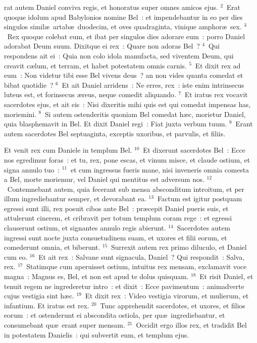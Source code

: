 \bchapter
{}rat autem Daniel conviva regis, et honoratus super omnes amicos ejus.
${}^{2}$~Erat quoque idolum apud Babylonios nomine Bel~: et impendebantur in eo per dies singulos simil\ae\ artab\ae\ duodecim, et oves quadraginta, vinique amphor\ae\ sex.
${}^{3}$~Rex quoque colebat eum, et ibat per singulos dies adorare eum~: porro Daniel adorabat Deum suum. Dixitque ei rex~: Quare non adoras Bel~?
${}^{4}$~Qui respondens ait ei~: Quia non colo idola manufacta, sed viventem Deum, qui creavit c\ae lum, et terram, et habet potestatem omnis carnis.
${}^{5}$~Et dixit rex ad eum~: Non videtur tibi esse Bel vivens deus~? an non vides quanta comedat et bibat quotidie~?
${}^{6}$~Et ait Daniel arridens~: Ne erres, rex~: iste enim intrinsecus luteus est, et forinsecus \ae reus, neque comedit aliquando.
${}^{7}$~Et iratus rex vocavit sacerdotes ejus, et ait eis~: Nisi dixeritis mihi quis est qui comedat impensas has, moriemini.
${}^{8}$~Si autem ostenderitis quoniam Bel comedat h\ae c, morietur Daniel, quia blasphemavit in Bel. Et dixit Daniel regi~: Fiat juxta verbum tuum.
${}^{9}$~Erant autem sacerdotes Bel septuaginta, exceptis uxoribus, et parvulis, et filiis.

 Et venit rex cum Daniele in templum Bel.
${}^{10}$~Et dixerunt sacerdotes Bel~: Ecce nos egredimur foras~: et tu, rex, pone escas, et vinum misce, et claude ostium, et signa annulo tuo~:
${}^{11}$~et cum ingressus fueris mane, nisi inveneris omnia comesta a Bel, morte moriemur, vel Daniel qui mentitus est adversum nos.
${}^{12}$~Contemnebant autem, quia fecerant sub mensa absconditum introitum, et per illum ingrediebantur semper, et devorabant ea.
${}^{13}$~Factum est igitur postquam egressi sunt illi, rex posuit cibos ante Bel~: pr\ae cepit Daniel pueris suis, et attulerunt cinerem, et cribravit per totum templum coram rege~: et egressi clauserunt ostium, et signantes annulo regis abierunt.
${}^{14}$~Sacerdotes autem ingressi sunt nocte juxta consuetudinem suam, et uxores et filii eorum, et comederunt omnia, et biberunt.
${}^{15}$~Surrexit autem rex primo diluculo, et Daniel cum eo.
${}^{16}$~Et ait rex~: Salvane sunt signacula, Daniel~? Qui respondit~: Salva, rex.
${}^{17}$~Statimque cum aperuisset ostium, intuitus rex mensam, exclamavit voce magna~: Magnus es, Bel, et non est apud te dolus quisquam.
${}^{18}$~Et risit Daniel, et tenuit regem ne ingrederetur intro~: et dixit~: Ecce pavimentum~: animadverte cujus vestigia sint h\ae c.
${}^{19}$~Et dixit rex~: Video vestigia virorum, et mulierum, et infantium. Et iratus est rex.
${}^{20}$~Tunc apprehendit sacerdotes, et uxores, et filios eorum~: et ostenderunt ei abscondita ostiola, per qu\ae\ ingrediebantur, et consumebant qu\ae\ erant super mensam.
${}^{21}$~Occidit ergo illos rex, et tradidit Bel in potestatem Danielis~: qui subvertit eum, et templum ejus.


